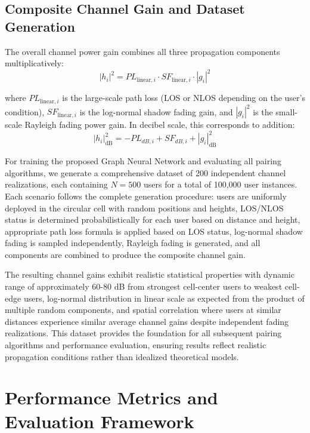 \subsection{Composite Channel Gain and Dataset Generation}

The overall channel power gain combines all three propagation components multiplicatively:
\begin{equation}
|h_i|^2 = PL_{\text{linear},i} \cdot SF_{\text{linear},i} \cdot |g_i|^2
\end{equation}

where $PL_{\text{linear},i}$ is the large-scale path loss (LOS or NLOS depending on the user's condition), $SF_{\text{linear},i}$ is the log-normal shadow fading gain, and $|g_i|^2$ is the small-scale Rayleigh fading power gain. In decibel scale, this corresponds to addition:
\begin{equation}
|h_i|^2_{\text{dB}} = -PL_{dB,i} + SF_{dB,i} + |g_i|^2_{\text{dB}}
\end{equation}

For training the proposed Graph Neural Network and evaluating all pairing algorithms, we generate a comprehensive dataset of 200 independent channel realizations, each containing $N = 500$ users for a total of 100,000 user instances. Each scenario follows the complete generation procedure: users are uniformly deployed in the circular cell with random positions and heights, LOS/NLOS status is determined probabilistically for each user based on distance and height, appropriate path loss formula is applied based on LOS status, log-normal shadow fading is sampled independently, Rayleigh fading is generated, and all components are combined to produce the composite channel gain.

The resulting channel gains exhibit realistic statistical properties with dynamic range of approximately 60-80 dB from strongest cell-center users to weakest cell-edge users, log-normal distribution in linear scale as expected from the product of multiple random components, and spatial correlation where users at similar distances experience similar average channel gains despite independent fading realizations. This dataset provides the foundation for all subsequent pairing algorithms and performance evaluation, ensuring results reflect realistic propagation conditions rather than idealized theoretical models.

\section{Performance Metrics and Evaluation Framework}

